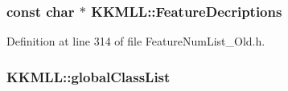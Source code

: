 \subsubsection[{\texorpdfstring{Feature\+Decriptions}{FeatureDecriptions}}]{\setlength{\rightskip}{0pt plus 5cm}const char $\ast$ K\+K\+M\+L\+L\+::\+Feature\+Decriptions}\hypertarget{namespace_k_k_m_l_l_aa9dd32008c0e0a781a504aeece8f6803}{}\label{namespace_k_k_m_l_l_aa9dd32008c0e0a781a504aeece8f6803}


Definition at line 314 of file Feature\+Num\+List\+\_\+\+Old.\+h.

\subsubsection[{\texorpdfstring{global\+Class\+List}{globalClassList}}]{ K\+K\+M\+L\+L\+::global\+Class\+List}\hypertarget{namespace_k_k_m_l_l_afa0d90c90139efe04c9eef5eb7c59d52}{}\label{namespace_k_k_m_l_l_afa0d90c90139efe04c9eef5eb7c59d52}
